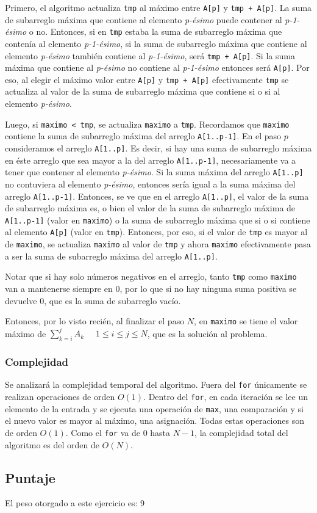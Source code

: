 Primero, el algoritmo actualiza \texttt{tmp} al máximo entre \texttt{A[p]} y  \texttt{tmp + A[p]}. La suma de subarreglo máxima que contiene al elemento \emph{p-ésimo} puede contener al \emph{p-1-ésimo} o no. Entonces, si en \texttt{tmp} estaba la suma de subarreglo máxima que contenía al elemento \emph{p-1-ésimo}, si la suma de subarreglo máxima que contiene al elemento \emph{p-ésimo} también contiene al \emph{p-1-ésimo}, será \texttt{tmp + A[p]}. Si la suma máxima que contiene al \emph{p-ésimo} no contiene al \emph{p-1-ésimo} entonces será \texttt{A[p]}. Por eso, al elegir el máximo valor entre \texttt{A[p]} y  \texttt{tmp + A[p]} efectivamente \texttt{tmp} se actualiza al valor de la suma de subarreglo máxima que contiene si o si al elemento \emph{p-ésimo}.

Luego, si \texttt{maximo < tmp}, se actualiza \texttt{maximo} a \texttt{tmp}. Recordamos que \texttt{maximo} contiene la suma de subarreglo máxima del arreglo \texttt{A[1..p-1]}. En el paso $p$ consideramos el arreglo \texttt{A[1..p]}. Es decir, si hay una suma de subarreglo máxima en éste arreglo que sea mayor a la del arreglo \texttt{A[1..p-1]}, necesariamente va a tener que contener al elemento \emph{p-ésimo}. Si la suma máxima del arreglo \texttt{A[1..p]} no contuviera al elemento \emph{p-ésimo}, entonces sería igual a la suma máxima del arreglo \texttt{A[1..p-1]}. Entonces, se ve que en el arreglo \texttt{A[1..p]}, el valor de la suma de subarreglo máxima es, o bien el valor de la suma de subarreglo máxima de \texttt{A[1..p-1]} (valor en \texttt{maximo}) o la suma de subarreglo máxima que si o si contiene al elemento \texttt{A[p]} (valor en \texttt{tmp}). Entonces, por eso, si el valor de \texttt{tmp} es mayor al de \texttt{maximo}, se actualiza \texttt{maximo} al valor de \texttt{tmp} y ahora \texttt{maximo} efectivamente pasa a ser la suma de subarreglo máxima del arreglo \texttt{A[1..p]}.

Notar que si hay solo números negativos en el arreglo, tanto \texttt{tmp} como \texttt{maximo} van a mantenerse siempre en 0, por lo que si no hay ninguna suma positiva se devuelve 0, que es la suma de subarreglo vacío.

Entonces, por lo visto recién, al finalizar el paso $N$, en \texttt{maximo} se tiene el valor máximo de $\sum_{k=i}^{j} A_k$            $ \quad 1\leq i\leq j\leq N$, que es la solución al problema.

\subsubsection{Complejidad}
Se analizará la complejidad temporal del algoritmo.
Fuera del \texttt{for} únicamente se realizan operaciones de orden $O(1)$. Dentro del \texttt{for}, en cada iteración se lee un elemento de la entrada y se ejecuta una operación de \texttt{max}, una comparación y si el nuevo valor es mayor al máximo, una asignación. Todas estas operaciones son de orden $O(1)$.
Como el \texttt{for} va de $0$ hasta $N-1$, la complejidad total del algoritmo es del orden de $O(N)$.

\subsection{Puntaje}
El peso otorgado a este ejercicio es: 9
